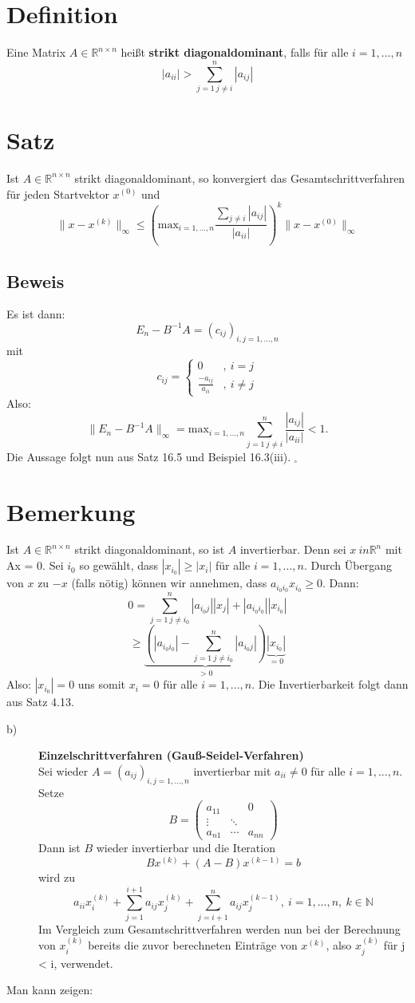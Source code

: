 \documentclass{scrbook}
\begin{document}
\section{Definition}
Eine Matrix $A \in \mathbb{R}^{n \times n}$ heißt \textbf{strikt diagonaldominant}, falls für alle $i=1,...,n$
\[|a_{ii}| > \sum^n_{j=1\ j \neq i} |a_{ij}|\]
\section{Satz}
Ist $A \in \mathbb{R}^{n \times n}$ strikt diagonaldominant, so konvergiert das Gesamtschrittverfahren für jeden Startvektor $x^{(0)}$ und
\[
\|x-x^{(k)}\|_{\infty} \leq \left(
\text{max}_{i=1,...,n}\frac{\sum_{j\neq i}|a_{ij}|}{|a_{ii}|}
\right)^k \|x-x^{(0)}\|_{\infty}
\]
\subsection*{Beweis}
Es ist dann:
\[E_n-B^{-1}A = (c_{ij})_{i,j=1,...,n}\]
mit
\[c_{ij}=\left\{
\begin{array}{cc}
0&,\ i=j\\
\frac{-a_{ij}}{a_{ii}}&,\ i\neq j
\end{array}
\right.\]
Also:
\[\|E_n-B^{-1}A\|_{\infty} = \text{max}_{i=1,...,n}\sum^n_{j=1\ j\neq i}\frac{|a_{ij}|}{|a_{ii}|}<1.\]
Die Aussage folgt nun aus Satz 16.5 und Beispiel 16.3(iii). $_\square$
\section{Bemerkung} Ist $A \in \mathbb{R}^{n\times n} $ strikt diagonaldominant, so ist $A$ invertierbar. Denn sei $x \ in \mathbb{R}^n$ mit Ax = 0. Sei $i_0$ so gewählt, dass $|x_{i_0}| \geq |x_i|$ für alle $i = 1,...,n$. Durch Übergang von $x$ zu $-x$ (falls nötig) können wir annehmen, dass $a_{i_0i_0}x_{i_0}\geq 0$. Dann:
\[
0 = \sum^n_{j=1 \ j \neq i_0} |a_{i_0j}||x_j|+|a_{i_0i_0}||x_{i_0}|
\]
\[\geq \underbrace{\left(
|a_{i_0i_0}| -\sum^n_{j=1 \ j \neq i_0} |a_{i_0j}| 
\right)}_{>0} \underbrace{|x_{i_0}|}_{=0}\]
Also: $|x_{i_0}| = 0$ uns somit $x_i = 0$ für alle $i=1,...,n$. Die Invertierbarkeit folgt dann aus Satz 4.13.
\begin{description}
\item[b)] \textbf{Einzelschrittverfahren (Gauß-Seidel-Verfahren)}\\
Sei wieder $A = (a_{ij})_{i,j=1,...,n}$ invertierbar mit $a_{ii} \neq 0 $ für alle $i = 1, ..., n$. Setze
\[B=
\left(
\begin{array}{ccc}
a_{11}&&0\\
\vdots&\ddots\\
a_{n1}&\cdots&a_{nn}
\end{array}
\right)
\]
Dann ist $B$ wieder invertierbar und die Iteration
\[Bx^{(k)} + (A-B)x^{(k-1)} = b\]
wird zu
\[a_{ii}x_i^{(k)}+\sum^{i+1}_{j=1}a_{ij}x_j^{(k)}+\sum^{n}_{j=i+1}a_{ij}x_j^{(k-1)},\ i=1,...,n,\ k \in \mathbb{N}\]
Im Vergleich zum Gesamtschrittverfahren werden nun bei der Berechnung von $x^{(k)}_i$ bereits die zuvor berechneten Einträge von $x^{(k)}$, also $x^{(k)}_j$ für j < i, verwendet. \end{description}
Man kann zeigen:
\end{document}
